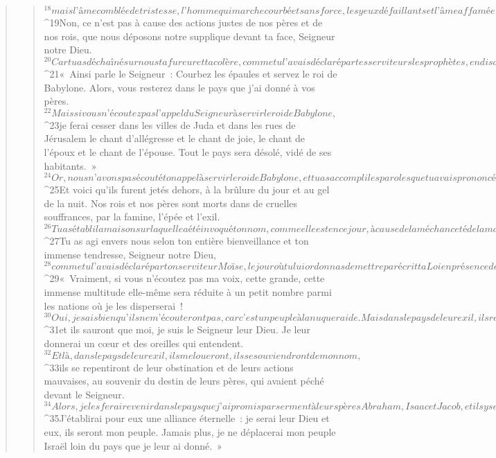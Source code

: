 \begin{verse}
\begin{verse}
${}^{18}mais l’âme comblée de tristesse, l’homme qui marche courbé et sans force, les yeux défaillants et l’âme affamée, ceux-là te rendront gloire et justice, Seigneur.
${}^{19}Non, ce n’est pas à cause des actions justes de nos pères et de nos rois, que nous déposons notre supplique devant ta face, Seigneur notre Dieu. 
${}^{20}Car tu as déchaîné sur nous ta fureur et ta colère, comme tu l’avais déclaré par tes serviteurs les prophètes, en disant :
${}^{21}« Ainsi parle le Seigneur : Courbez les épaules et servez le roi de Babylone. Alors, vous resterez dans le pays que j’ai donné à vos pères. 
${}^{22}Mais si vous n’écoutez pas l’appel du Seigneur à servir le roi de Babylone, 
${}^{23}je ferai cesser dans les villes de Juda et dans les rues de Jérusalem le chant d’allégresse et le chant de joie, le chant de l’époux et le chant de l’épouse. Tout le pays sera désolé, vidé de ses habitants. »
${}^{24}Or, nous n’avons pas écouté ton appel à servir le roi de Babylone, et tu as accompli les paroles que tu avais prononcées par tes serviteurs les prophètes, à savoir que les ossements de nos rois et de nos pères seraient arrachés à leur tombeau. 
${}^{25}Et voici qu’ils furent jetés dehors, à la brûlure du jour et au gel de la nuit. Nos rois et nos pères sont morts dans de cruelles souffrances, par la famine, l’épée et l’exil.
${}^{26}Tu as établi la maison sur laquelle a été invoqué ton nom, comme elle est en ce jour, à cause de la méchanceté de la maison d’Israël et de la maison de Juda. 
${}^{27}Tu as agi envers nous selon ton entière bienveillance et ton immense tendresse, Seigneur notre Dieu, 
${}^{28}comme tu l’avais déclaré par ton serviteur Moïse, le jour où tu lui ordonnas de mettre par écrit ta Loi en présence des fils d’Israël, en disant :
${}^{29}« Vraiment, si vous n’écoutez pas ma voix, cette grande, cette immense multitude elle-même sera réduite à un petit nombre parmi les nations où je les disperserai ! 
${}^{30}Oui, je sais bien qu’ils ne m’écouteront pas, car c’est un peuple à la nuque raide. Mais dans le pays de leur exil, ils rentreront en eux-mêmes, 
${}^{31}et ils sauront que moi, je suis le Seigneur leur Dieu. Je leur donnerai un cœur et des oreilles qui entendent. 
${}^{32}Et là, dans le pays de leur exil, ils me loueront, ils se souviendront de mon nom, 
${}^{33}ils se repentiront de leur obstination et de leurs actions mauvaises, au souvenir du destin de leurs pères, qui avaient péché devant le Seigneur. 
${}^{34}Alors, je les ferai revenir dans le pays que j’ai promis par serment à leurs pères Abraham, Isaac et Jacob, et ils y seront maîtres. Je les multiplierai, ils ne diminueront plus ! 
${}^{35}J’établirai pour eux une alliance éternelle : je serai leur Dieu et eux, ils seront mon peuple. Jamais plus, je ne déplacerai mon peuple Israël loin du pays que je leur ai donné. »
      

\end{verse}
\end{verse}
